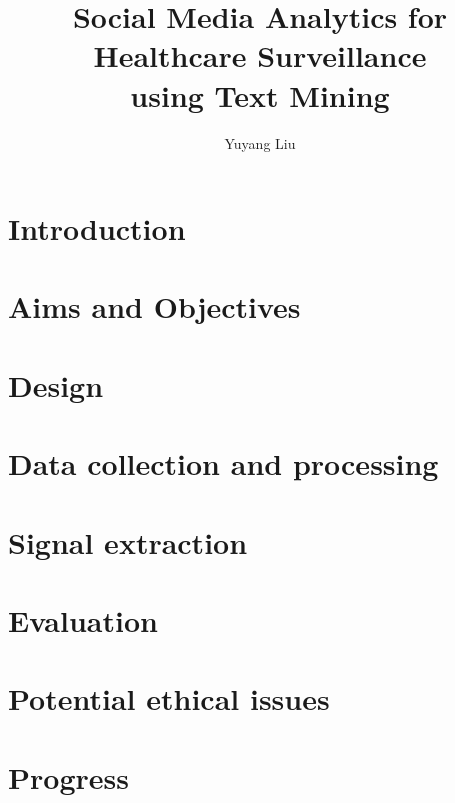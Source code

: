 \documentclass[12pt]{report}
\begin{document}
\title{Social Media Analytics for Healthcare Surveillance \\using Text Mining}
\author{Yuyang Liu}
\normallinespacing
\maketitle

\tableofcontents %
\body
\chapter{Introduction} %

 
\chapter{Aims and Objectives}

 
\chapter{Design}


\chapter{Data collection and processing}


\chapter{Signal extraction}


\chapter{Evaluation}


\chapter{Potential ethical issues}


\chapter{Progress}




\end{document}
